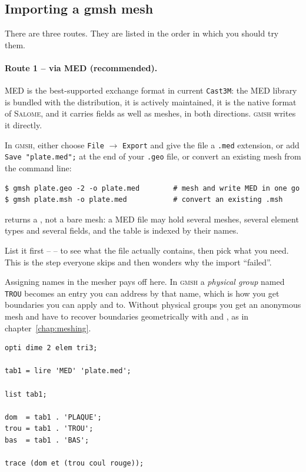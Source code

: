 \subsection{Importing a gmsh mesh}
\label{sec:io:gmsh}

There are three routes. They are listed in the order in which you should try
them.

\paragraph{Route 1 -- via MED (recommended).} MED is the best-supported
exchange format in current \texttt{Cast3M}: the MED library is bundled with
the distribution, it is actively maintained, it is the native format of
\textsc{Salome}, and it carries fields as well as meshes, in both directions.
\textsc{gmsh} writes it directly.

In \textsc{gmsh}, either choose \texttt{File} $\rightarrow$ \texttt{Export}
and give the file a \texttt{.med} extension, or add \texttt{Save "plate.med";}
at the end of your \texttt{.geo} file, or convert an existing mesh from the
command line:

\begin{codebox}
\begin{verbatim}
$ gmsh plate.geo -2 -o plate.med        # mesh and write MED in one go
$ gmsh plate.msh -o plate.med           # convert an existing .msh
\end{verbatim}
\end{codebox}

\begin{castemcom}
 returns a , not a bare mesh: a MED file may hold
several meshes, several element types and several fields, and the table is
indexed by their names.

List it first --  -- to see what the file actually contains,
then pick what you need. This is the step everyone skips and then wonders why
the import ``failed''.

\medskip
Assigning names in the mesher pays off here. In \textsc{gmsh} a
\emph{physical group} named \texttt{TROU} becomes an entry you can address by
that name, which is how you get boundaries you can apply  and
 to. Without physical groups you get an anonymous mesh and have to
recover boundaries geometrically with  and , as in
chapter~\ref{chap:meshing}.
\end{castemcom}
\begin{castemlines}
\begin{verbatim}
opti dime 2 elem tri3;

tab1 = lire 'MED' 'plate.med';

list tab1;

dom  = tab1 . 'PLAQUE';
trou = tab1 . 'TROU';
bas  = tab1 . 'BAS';

trace (dom et (trou coul rouge));
\end{verbatim}
\end{castemlines}

